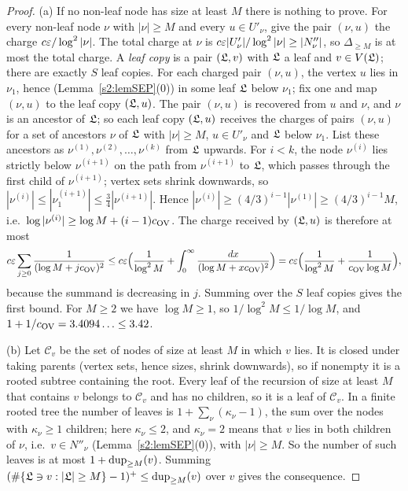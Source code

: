 \begin{proof}
(a) If no non-leaf node has size at least $M$ there is nothing to prove. For
every non-leaf node $\nu$ with $|\nu|\ge M$ and every $u\in U'_\nu$, give the
pair $(\nu,u)$ the charge $c\varepsilon/\log^2|\nu|$. The total charge at $\nu$ is
$c\varepsilon|U'_\nu|/\log^2|\nu|\ge|N''_\nu|$, so $\Delta_{\ge M}$ is at most the
total charge. A \emph{leaf copy} is a pair $(\mathfrak{L},v)$ with $\mathfrak{L}$ a leaf and
$v\in V(\mathfrak{L})$; there are exactly $S$ leaf copies. For each charged pair
$(\nu,u)$, the vertex $u$ lies in $\nu_1$, hence (Lemma~\ref{s2:lemSEP}(0)) in
some leaf $\mathfrak{L}$ below $\nu_1$; fix one and map $(\nu,u)$ to the leaf copy
$(\mathfrak{L},u)$. The pair $(\nu,u)$ is recovered from $u$ and $\nu$, and $\nu$ is
an ancestor of $\mathfrak{L}$; so each leaf copy $(\mathfrak{L},u)$ receives the charges of
pairs $(\nu,u)$ for a set of ancestors $\nu$ of $\mathfrak{L}$ with $|\nu|\ge M$,
$u\in U'_\nu$ and $\mathfrak{L}$ below $\nu_1$. List these ancestors as
$\nu^{(1)},\nu^{(2)},\dots,\nu^{(k)}$ from $\mathfrak{L}$ upwards. For $i<k$, the
node $\nu^{(i)}$ lies strictly below $\nu^{(i+1)}$ on the path from
$\nu^{(i+1)}$ to $\mathfrak{L}$, which passes through the first child of
$\nu^{(i+1)}$; vertex sets shrink downwards, so
$|\nu^{(i)}|\le|\nu^{(i+1)}_1|\le\frac34|\nu^{(i+1)}|$. Hence
$|\nu^{(i)}|\ge(4/3)^{i-1}|\nu^{(1)}|\ge(4/3)^{i-1}M$, i.e.\
$\log|\nu^{(i)}|\ge\log M+(i-1)c_{\mathrm{OV}}$. The charge received by $(\mathfrak{L},u)$ is
therefore at most
\[
c\varepsilon\sum_{j\ge0}\frac1{(\log M+jc_{\mathrm{OV}})^2}\le
c\varepsilon\Bigl(\frac1{\log^2M}+\int_0^\infty\frac{dx}{(\log M+xc_{\mathrm{OV}})^2}\Bigr)
=c\varepsilon\Bigl(\frac1{\log^2M}+\frac1{c_{\mathrm{OV}}\log M}\Bigr),
\]
because the summand is decreasing in $j$. Summing over the $S$ leaf copies
gives the first bound. For $M\ge2$ we have $\log M\ge1$, so
$1/\log^2M\le1/\log M$, and $1+1/c_{\mathrm{OV}}=3.4094\ldots\le3.42$.

(b) Let $\mathcal{C}_v$ be the set of nodes of size at least $M$ in which $v$ lies. It
is closed under taking parents (vertex sets, hence sizes, shrink downwards), so
if nonempty it is a rooted subtree containing the root. Every leaf of the
recursion of size at least $M$ that contains $v$ belongs to $\mathcal{C}_v$ and has no
children, so it is a leaf of $\mathcal{C}_v$. In a finite rooted tree the number of
leaves is $1+\sum_\nu(\kappa_\nu-1)$, the sum over the nodes with
$\kappa_\nu\ge1$ children; here $\kappa_\nu\le2$, and $\kappa_\nu=2$ means that
$v$ lies in both children of $\nu$, i.e.\ $v\in N''_\nu$
(Lemma~\ref{s2:lemSEP}(0)), with $|\nu|\ge M$. So the number of such leaves is
at most $1+\mathrm{dup}_{\ge M}(v)$. Summing $(\#\{\mathfrak{L}\ni v:|\mathfrak{L}|\ge M\}-1)^+\le
\mathrm{dup}_{\ge M}(v)$ over $v$ gives the consequence.


\end{proof}
